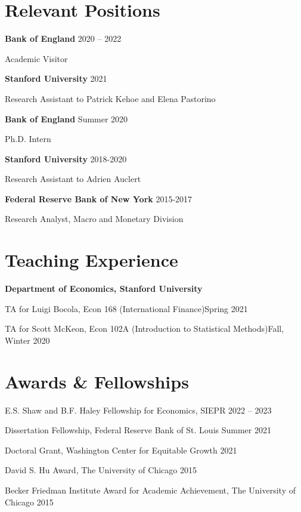 \documentclass[margin,line]{res}                          %
\def\tinyskip{\vspace\tinyskipamount}
\newenvironment{list1}{
	\begin{list}{\ding{113}}{%
			\setlength{\itemsep}{0in}
			\setlength{\parsep}{0in} \setlength{\parskip}{0in}
			\setlength{\topsep}{0in} \setlength{\partopsep}{0in}
			\setlength{\leftmargin}{0.17in}}}{\end{list}}
\begin{document}
\begin{resume}
	\section{\sc Relevant Positions}
	\begin{list1}
		\item[] \textbf{Bank of England}  \hfill 2020 -- 2022\tinyskip
		\item[] {Academic Visitor}
		\smallskip
		\item[] \textbf{Stanford University}  \hfill 2021\tinyskip
		\item[] {Research Assistant to Patrick Kehoe and Elena Pastorino}
		\smallskip
		\item[] \textbf{Bank of England}  \hfill Summer 2020\tinyskip
		\item[] {Ph.D. Intern}
		\smallskip
		\item[] \textbf{Stanford University}  \hfill 2018-2020 \tinyskip
		\item[] {Research Assistant to Adrien Auclert}\smallskip
		\item[] \textbf{Federal Reserve Bank of New York}  \hfill 2015-2017 \tinyskip
		\item[] {Research Analyst, Macro and Monetary Division}
		
	\end{list1}
	
	\section{\sc Teaching Experience}
	\begin{list1}
		\item[] \textbf{Department of Economics, Stanford University} \smallskip
		\item[] TA for Luigi Bocola, Econ 168 (International Finance)\hfill Spring 2021\smallskip
		\item[] TA for Scott McKeon, Econ 102A (Introduction to Statistical Methods)\hfill Fall, Winter 2020\smallskip
	\end{list1}
	
	\section{\sc Awards \& Fellowships}
	\begin{list1}
		\item[] E.S. Shaw and B.F. Haley Fellowship for Economics, SIEPR \hfill 2022 -- 2023\smallskip
		\item[] Dissertation Fellowship, Federal Reserve Bank of St. Louis  \hfill Summer 2021\smallskip
		\item[] Doctoral Grant, Washington Center for Equitable Growth  \hfill 2021 \smallskip
		\item[] David S. Hu Award, The University of Chicago \hfill 2015\smallskip
		\item[] Becker Friedman Institute Award for Academic Achievement, The University of Chicago \hfill 2015\smallskip   
	\end{list1}
	

\end{resume}
\end{document}
